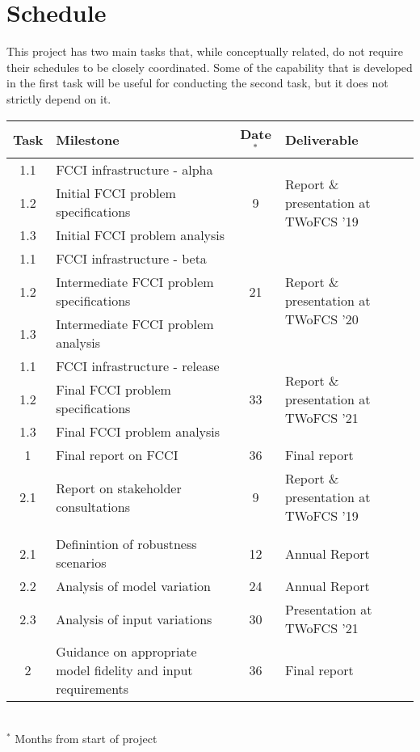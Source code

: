 \section{Schedule}

This project has two main tasks that, while conceptually related, do not
require their schedules to be closely coordinated.  Some of the capability
that is developed in the first task will be useful for conducting the second
task, but it does not strictly depend on it.


\begin{table}[!]
  \begin{center}
    \begin{tabular}{|c|p{}|c|p{}|}\hline\hline
      \textbf{Task} & \textbf{Milestone} & \textbf{Date$^*$} & \textbf{Deliverable} \\\hline\hline
      1.1 & \gls{FCCI} infrastructure - alpha &   & \multirow{3}{0.3\textwidth}{Report \& presentation at TWoFCS '19} \\
      1.2 & Initial \gls{FCCI} problem specifications & 9 & \\
      1.3 & Initial \gls{FCCI} problem analysis &  & \\\hline
      1.1 & \gls{FCCI} infrastructure - beta &   & \multirow{3}{0.3\textwidth}{Report \& presentation at TWoFCS '20} \\
      1.2 & Intermediate \gls{FCCI} problem specifications & 21 & \\
      1.3 & Intermediate \gls{FCCI} problem analysis &  & \\\hline
      1.1 & \gls{FCCI} infrastructure - release &  & \multirow{3}{0.3\textwidth}{Report \& presentation at TWoFCS '21} \\
      1.2 & Final \gls{FCCI} problem specifications & 33 & \\
      1.3 & Final \gls{FCCI} problem analysis &  & \\\hline
      1 & Final report on \gls{FCCI} & 36 & Final report\\
      \hline\hline
      2.1 & Report on stakeholder consultations & 9 & \multirow{1}{0.3\textwidth}{Report \& presentation at TWoFCS '19} \\
          & & &\\
      2.1 & Definintion of robustness scenarios & 12 & Annual Report\\
      2.2 & Analysis of model variation & 24 & Annual Report\\
      2.3 & Analysis of input variations & 30 & Presentation at TWoFCS '21\\\hline
      2 & Guidance on appropriate model fidelity and input requirements & 36 & Final report\\
      \hline\hline
    \end{tabular}\\
    $^*$ Months from start of project
  \end{center}
\end{table}


